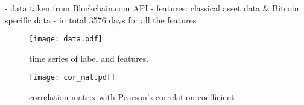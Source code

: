 - data taken from Blockchain.com API \cite{Data}
- features: classical asset data \& Bitcoin specific data
- in total 3576 days for all the features

\begin{figure}
  \centering
  \texttt{[image: data.pdf]}
  \caption{time series of label and features.}
\end{figure}

\begin{figure}
  \centering
  \texttt{[image: cor\_mat.pdf]}
  \caption{correlation matrix with Pearson's correlation coefficient}
\end{figure}
